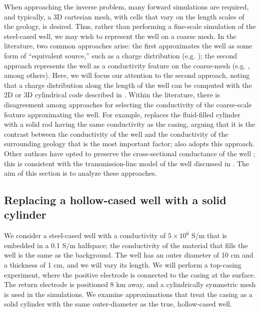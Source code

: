\documentclass[extra,mreferee]{gji}
\begin{document}
When approaching the inverse problem, many forward simulations are required, and typically, a 3D cartesian mesh, with cells that vary on the length scales of the geology, is desired. Thus, rather than performing a fine-scale simulation of the steel-cased well, we may wish to represent the well on a coarse mesh. In the literature, two common approaches arise: the first approximates the well as some form of ``equivalent source,'' such as a charge distribution (e.g. \cite{Weiss2016}); the second approach represents the well as a conductivity feature on the coarse-mesh (e.g. \cite{Swidinsky2013, Um2015, Yang2016, Kohnke2017, Puzyrev2017}, among others). Here, we will focus our attention to the second approach, noting that a charge distribution along the length of the well can be computed with the 2D or 3D cylindrical code described in \cite{Heagy2018a}. Within the literature, there is disagreement among approaches for selecting the conductivity of the coarse-scale feature approximating the well. For example, \cite{Um2015} replaces the fluid-filled cylinder with a solid rod having the same conductivity as the casing, arguing that it is the contrast between the conductivity of the well and the conductivity of the surrounding geology that is the most important factor; \cite{Puzyrev2017} also adopts this approach. Other authors have opted to preserve the cross-sectional conductance of the well \citep{Swidinsky2013, Kohnke2017}; this is consistent with the transmission-line model of the well discussed in \cite{Kaufman1990}. The aim of this section is to analyze these approaches.

\subsection{Replacing a hollow-cased well with a solid cylinder}

We consider a steel-cased well with a conductivity of $5\times10^6$ S/m that is embedded in a 0.1 S/m halfspace; the conductivity of the material that fills the well is the same as the background. The well has an outer diameter of 10 cm and a thickness of 1 cm, and we will vary its length. We will perform a top-casing experiment, where the positive electrode is connected to the casing at the surface. The return electrode is positioned 8 km away, and a cylindrically symmetric mesh is used in the simulations. We examine approximations that treat the casing as a solid cylinder with the same outer-diameter as the true, hollow-cased well.
\end{document}
